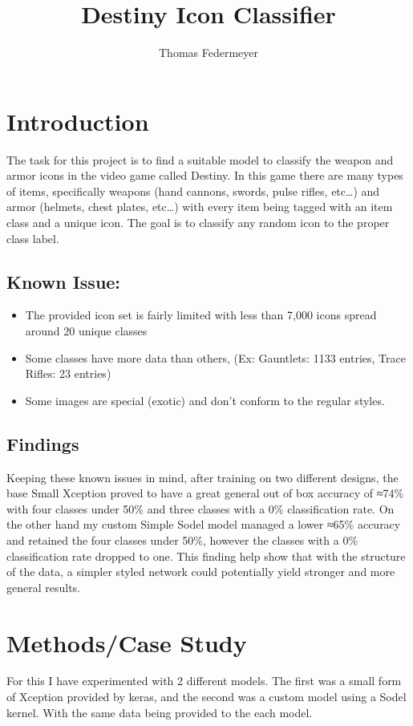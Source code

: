 \documentclass[11pt,a4paper]{article}
\title{Destiny Icon Classifier}
\author{Thomas Federmeyer}
\begin{document}
\date{} %
\maketitle

\section{Introduction}
The task for this project is to find a suitable model to classify the weapon and armor icons in the video game called Destiny. In this game there are many types of items, specifically weapons (hand cannons, swords, pulse rifles, etc…) and armor (helmets, chest plates, etc…) with every item being tagged with an  item class and a unique icon. The goal is to classify any random icon to the proper class label.

\subsection*{Known Issue:}

\begin{itemize}
  \item The provided icon set is fairly limited with less than 7,000 icons spread around 20 unique classes
  \item Some classes have more data than others, (Ex: Gauntlets: 1133 entries, Trace Rifles: 23 entries)
  \item Some images are special (exotic) and don't conform to the regular styles.
\end{itemize}

\subsection*{Findings}
Keeping these known issues in mind, after training on two different designs, the base Small Xception proved to have a great general out of box accuracy of  ≈74\% with four classes under 50\% and three classes with a 0\% classification rate. On the other hand my custom Simple Sodel model managed a lower ≈65\% accuracy and retained the four classes under 50\%, however the classes with a 0\% classification rate dropped to one. This finding help show that with the structure of the data, a simpler styled network could potentially yield stronger and more general results.

\section{Methods/Case Study}\label{sec:methods}
For this I have experimented with 2 different models. The first was a small form of Xception provided by keras, and the second was a custom model using a Sodel kernel. With the same data being provided to the each model.
\end{document}
